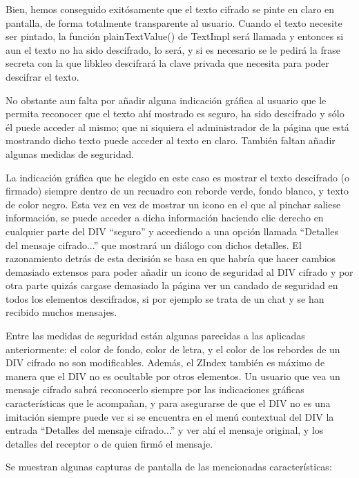 Bien, hemos conseguido exitósamente que el texto cifrado se pinte en claro en pantalla, de forma totalmente transparente al usuario. Cuando el texto necesite ser pintado, la función plainTextValue() de TextImpl será llamada y entonces si aun el texto no ha sido descifrado, lo será, y si es necesario se le pedirá la frase secreta con la que libkleo descifrará la clave privada que necesita para poder descifrar el texto.

No obstante aun falta por añadir alguna indicación gráfica al usuario que le permita reconocer que el texto ahí mostrado es seguro, ha sido descifrado y sólo él puede acceder al mismo; que ni siquiera el administrador de la página que está mostrando dicho texto puede acceder al texto en claro. También faltan añadir algunas medidas de seguridad.

La indicación gráfica que he elegido en este caso es mostrar el texto descifrado (o firmado) siempre dentro de un recuadro con reborde verde, fondo blanco, y texto de color negro. Esta vez en vez de mostrar un icono en el que al pinchar saliese información, se puede acceder a dicha información haciendo clic derecho en cualquier parte del DIV ``seguro'' y accediendo a una opción llamada ``Detalles del mensaje cifrado...'' que mostrará un diálogo con dichos detalles. El razonamiento detrás de esta decisión se basa en que habría que hacer cambios demasiado extensos para poder añadir un icono de seguridad al DIV cifrado y por otra parte quizás cargase demasiado la página ver un candado de seguridad en todos los elementos descifrados, si por ejemplo se trata de un chat y se han recibido muchos mensajes.

Entre las medidas de seguridad están algunas parecidas a las aplicadas anteriormente: el color de fondo, color de letra, y el color de los rebordes de un DIV cifrado no son modificables. Además, el ZIndex también es máximo de manera que el DIV no es ocultable por otros elementos. Un usuario que vea un mensaje cifrado sabrá reconocerlo siempre por las indicaciones gráficas características que le acompañan, y para asegurarse de que el DIV no es una imitación siempre puede ver si se encuentra en el menú contextual del DIV la entrada ``Detalles del mensaje cifrado...'' y ver ahí el mensaje original, y los detalles del receptor o de quien firmó el mensaje.

Se muestran algunas capturas de pantalla de las mencionadas características:



